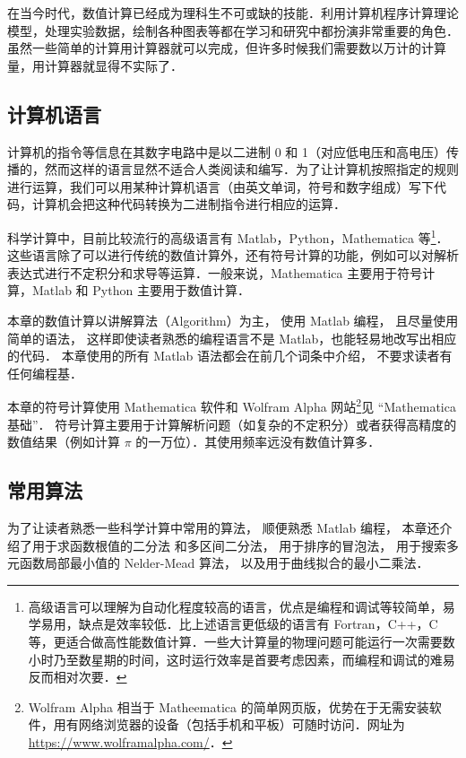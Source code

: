 
在当今时代，数值计算已经成为理科生不可或缺的技能．利用计算机程序计算理论模型，处理实验数据，绘制各种图表等都在学习和研究中都扮演非常重要的角色．虽然一些简单的计算用计算器就可以完成，但许多时候我们需要数以万计的计算量，用计算器就显得不实际了．

\subsection{计算机语言}
计算机的指令等信息在其数字电路中是以二进制 0 和 1（对应低电压和高电压）传播的，然而这样的语言显然不适合人类阅读和编写．为了让计算机按照指定的规则进行运算，我们可以用某种计算机语言（由英文单词，符号和数字组成）写下代码，计算机会把这种代码转换为二进制指令进行相应的运算．

科学计算中，目前比较流行的高级语言有 Matlab，Python，Mathematica 等\footnote{高级语言可以理解为自动化程度较高的语言，优点是编程和调试等较简单，易学易用，缺点是效率较低．比上述语言更低级的语言有 Fortran，C++，C 等，更适合做高性能数值计算．一些大计算量的物理问题可能运行一次需要数小时乃至数星期的时间，这时运行效率是首要考虑因素，而编程和调试的难易反而相对次要．}．这些语言除了可以进行传统的数值计算外，还有符号计算的功能，例如可以对解析表达式进行不定积分和求导等运算．一般来说，Mathematica 主要用于符号计算，Matlab 和 Python 主要用于数值计算．

本章的数值计算以讲解算法（Algorithm）为主， 使用 Matlab 编程， 且尽量使用简单的语法， 这样即使读者熟悉的编程语言不是 Matlab，也能轻易地改写出相应的代码． 本章使用的所有 Matlab 语法都会在前几个词条中介绍， 不要求读者有任何编程基．

本章的符号计算使用 Mathematica 软件和 Wolfram Alpha 网站\footnote{Wolfram Alpha 相当于 Matheematica 的简单网页版，优势在于无需安装软件，用有网络浏览器的设备（包括手机和平板）可随时访问．网址为 \href{https://www.wolframalpha.com/}{\color{blue}https://www.wolframalpha.com/}．}见 “Mathematica 基础”．%
符号计算主要用于计算解析问题（如复杂的不定积分）或者获得高精度的数值结果（例如计算 $\pi$ 的一万位）．其使用频率远没有数值计算多．

\subsection{常用算法}
为了让读者熟悉一些科学计算中常用的算法， 顺便熟悉 Matlab 编程， 本章还介绍了用于求函数根值的二分法 和多区间二分法， 用于排序的冒泡法， 用于搜索多元函数局部最小值的 Nelder-Mead 算法， 以及用于曲线拟合的最小二乘法．%


